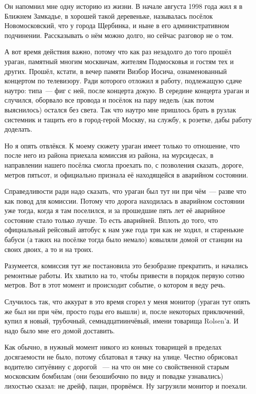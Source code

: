 Он напомнил мне одну историю из жизни. В начале августа 1998 года жил я в Ближнем Замкадье, в хорошей такой деревеньке, называлась посёлок Новомосковский, что у города Щербинка, и ныне в его административном подчинении. Рассказывать о нём можно долго, но сейчас разговор не о том.

А вот время действия важно, потому что как раз незадолго до того прошёл ураган, памятный многим москвичам, жителям Подмосковья и гостям тех и других. Прошёл, кстати, в вечер памяти Визбор Иосича, ознаменованный концертом по телевизору. Ради которого отложил я работу, подлежащую сдаче наутро: типа~--- фиг с ней, после концерта докую. В середине концерта ураган и случился, оборвало все провода и посёлок на пару недель (как потом выяснилось) остался без света. Так что наутро мне пришлось брать в рузлак системник и тащить его в город-герой Москву, на службу, к розетке, дабы работу доделать.

Но я опять отвлёкся. К моему сюжету ураган имеет только то отношение, что после него из района приехала комиссия из района, на мурсидесах, в направлении нашего посёлка смогла проехать по, с позволения сказать, дороге, метров пятьсот, и официально признала её находящейся в аварийном состоянии.

Справедливости ради надо сказать, что ураган был тут ни при чём~--- разве что как повод для комиссии. Потому что дорога находилась в аварийном состоянии уже тогда, когда я там поселился, и за прошедшие пять лет её аварийное состояние стало только лучше. То есть аварийней. Вплоть до того, что официальный рейсовый автобус к нам уже года три как не ходил, и старенькие бабуси (а таких на посёлке тогда было немало) ковыляли домой от станции на своих двоих, а то и на троих.

Разумеется, комиссия тут же постановила это безобразие прекратить, и начались ремонтные работы. Их хватило на то, чтобы привести в порядок первую сотню метров. Вот в этот момент и происходит  событие, о котором я веду речь.

Случилось так, что аккурат в это время сгорел у меня монитор (ураган тут опять же был ни при чём, просто годы его вышли) и, после некоторых приключений, купил я новый, трубочный, семнадцатиинчёвый, имени товарища Rolsen'а. И надо было мне его домой доставить.

Как обычно, в нужный момент никого из конных товарищей в пределах досягаемости не было, потому сблатовал я тачку на улице. Честно обрисовал водителю ситуёвину с дорогой ~--- на что он мне со свойственной старым московским бомбилам (они безошибочно по виду и повадке узнавались) лихостью сказал: не дрейф, пацан, прорвёмся. Ну загрузили монитор и поехали.

